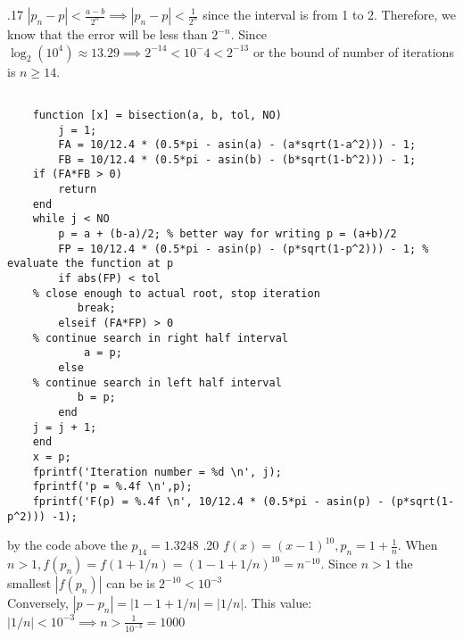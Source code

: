 \documentclass[11pt]{exam}
\theoremstyle{plain}
\theoremstyle{definition}\newtheorem{definition}[theorem]{Definition}
\theoremstyle{definition}\newtheorem*{definition*}{Definition}
\begin{document}
\begin{questions}
.17 
$|p_n - p| < \frac{a - b}{2^n} \implies |p_n - p| < \frac{1}{2^n}$ since the interval is from 1 to 2. Therefore, we know that the error will be less than $2^{-n}$. Since $\log_2(10^4) \approx 13.29 \implies 2^{-14} < 10^-4 < 2^{-13}$ or the bound of number of iterations is $n \geq 14$. 
\begin{lstlisting}[style=Matlab-editor]
   
    function [x] = bisection(a, b, tol, NO)
        j = 1;
        FA = 10/12.4 * (0.5*pi - asin(a) - (a*sqrt(1-a^2))) - 1;
        FB = 10/12.4 * (0.5*pi - asin(b) - (b*sqrt(1-b^2))) - 1;
    if (FA*FB > 0)
        return
    end
    while j < NO
        p = a + (b-a)/2; % better way for writing p = (a+b)/2
        FP = 10/12.4 * (0.5*pi - asin(p) - (p*sqrt(1-p^2))) - 1; % evaluate the function at p
        if abs(FP) < tol
    % close enough to actual root, stop iteration
           break;
        elseif (FA*FP) > 0
    % continue search in right half interval
            a = p;
        else
    % continue search in left half interval
           b = p;
        end
    j = j + 1;
    end
    x = p;
    fprintf('Iteration number = %d \n', j);
    fprintf('p = %.4f \n',p);
    fprintf('F(p) = %.4f \n', 10/12.4 * (0.5*pi - asin(p) - (p*sqrt(1-p^2))) -1);

\end{lstlisting}
by the code above the $p_{14} = 1.3248 $ 
.20 
$f\left(x\right) = \left({x-1}\right)^{10}, p_n = 1 + \frac{1}{n}$. When $n > 1, f(p_n) = f( 1 + 1/n) = \left(1 - 1 + 1/n\right)^{10} = n^{-10}$. Since $n > 1$ the smallest $|f(p_n)|$ can be is $2^{-10} < 10^{-3}$\\
Conversely, $|p - p_n| = |1 - 1 + 1/n| = |1/n|$. This value: $|1/n| < 10^{-3} \implies n > \frac{1}{10^{-3}} = 1000$ 
\end{questions}
\end{document}

